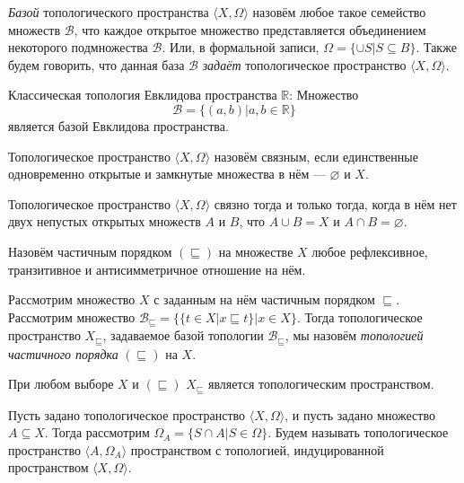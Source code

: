 \begin{definition} \emph{Базой} топологического пространства $\langle X, \Omega \rangle$ назовём
любое такое семейство множеств $\mathcal{B}$, что каждое открытое множество представляется
объединением некоторого подмножества $\mathcal{B}$. Или, в формальной записи,
$\Omega = \{\cup S | S \subseteq B\}$.
Также будем говорить, что данная база $\mathcal{B}$ \emph{задаёт} топологическое 
пространство $\langle X, \Omega \rangle$.
\end{definition}

\begin{theorem} Классическая топология Евклидова пространства $\mathbb{R}$:
    Множество $$\mathcal{B} = \{(a,b)|a,b\in \mathbb{R}\}$$ является базой Евклидова пространства.
\end{theorem}

\begin{definition} Топологическое пространство $\langle X, \Omega \rangle$ назовём 
связным, если единственные одновременно открытые и замкнутые множества в нём --- $\varnothing$ и $X$.
\end{definition}

\begin{theorem} Топологическое пространство $\langle X, \Omega \rangle$ связно тогда и только тогда, 
когда в нём нет двух непустых открытых множеств $A$ и $B$, что $A \cup B = X$ и $A \cap B = \varnothing$.
\end{theorem}

\begin{definition} Назовём частичным порядком $(\sqsubseteq)$ на множестве $X$ любое 
рефлексивное, транзитивное и антисимметричное отношение на нём.
\end{definition}

\begin{definition} Рассмотрим множество $X$ с заданным на нём частичным порядком $\sqsubseteq$.
Рассмотрим множество $\mathcal{B}_\sqsubseteq = \{ \{ t \in X | x \sqsubseteq t \}| x \in X\}$.
Тогда топологическое пространство $X_\sqsubseteq$, задаваемое базой топологии $\mathcal{B}_\sqsubseteq$,
мы назовём \emph{топологией частичного порядка} $(\sqsubseteq)$ на $X$.
\end{definition}

\begin{theorem} При любом выборе $X$ и $(\sqsubseteq)$ $X_\sqsubseteq$ является топологическим пространством.
\end{theorem}

\begin{definition} Пусть задано топологическое пространство $\langle X, \Omega \rangle$, и пусть
задано множество $A \subseteq X$. Тогда рассмотрим $\Omega_A = \{ S \cap A | S \in \Omega \}$.
Будем называть топологическое пространство $\langle A, \Omega_A \rangle$ пространством с топологией,
индуцированной пространством $\langle X, \Omega \rangle$.
\end{definition}

